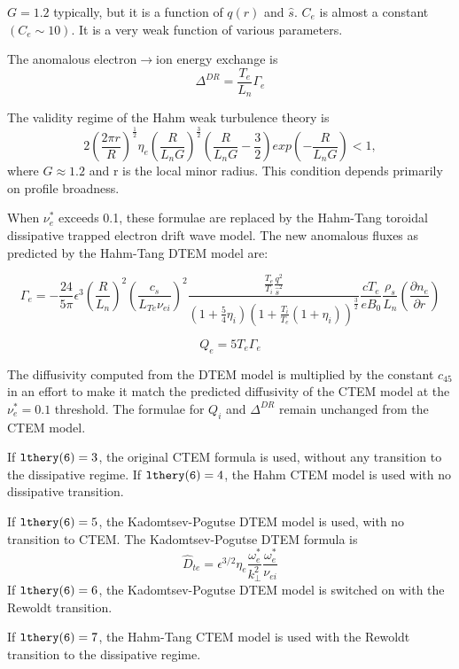 $G = 1.2$ typically, but it is a function of $q(r)$ and $\hat{s}.$
$C_{e}$ is almost a constant $(C_{e} \sim 10).$
It is a very weak function of various parameters.

The anomalous electron$\rightarrow$ion energy exchange is
\[
\Delta^{DR} = \frac{T_{e}}{L_{n}}\Gamma_{e}
\]
 

The validity regime of the Hahm weak turbulence theory is
\[
2
\left(\frac{2\pi
r}{R}\right)^\frac{1}{2}\eta_{e}\left(\frac{R}{L_{n}G}\right)^\frac{3}{2}\left(\frac{R}{L_{n}G}
- \frac{3}{2}\right)exp\left(-\frac{R}{L_{n}G}\right) < 1 ,\] 
where $G\approx 1.2$ and r is the local minor radius. This condition
depends primarily on profile broadness.

When $\nu_{e}^{*}$ exceeds 0.1, these formulae are replaced by the
Hahm-Tang toroidal dissipative trapped electron drift wave model.
The new anomalous fluxes as predicted by the Hahm-Tang DTEM model are:

\[
\Gamma_{e}=-\frac{24}{5\pi}\epsilon^{3}\left(\frac{R}{L_{n}}\right)^{2}
           \left(\frac{c_{s}}{L_{Te}\nu_{ei}}\right)^{2}
           \frac{\frac{T_{e}}{T_{i}}\frac{q^{2}}{\hat s^{2}}}
           {(1+\frac{5}{4}\eta_{i})(1+\frac{T_{i}}{T_{e}}
           (1+\eta_{i}))^{\frac{3}{2}}}\frac{cT_{e}}{eB_{0}}
           \frac{\rho_{s}}{L_{n}}\left(\frac{\partial{n_{e}}}
           {\partial{r}}\right)
\]

\[
Q_{e}=5T_{e}\Gamma_{e}
\]

The diffusivity computed from the DTEM model is multiplied by the 
constant $c_{45}$ in an effort to make it match the predicted diffusivity
of the CTEM model at the $ \nu_{e}^{*}=0.1 $ threshold.  The formulae
for $Q_{i}$ and $\Delta^{DR}$ remain unchanged from the CTEM model.
 
If $ {\tt lthery(6)} = 3 $, the original CTEM formula is used, without any
transition to the dissipative regime.  If $ {\tt lthery(6)} = 4 $,
the Hahm CTEM model is used with no dissipative transition. 

If $ {\tt lthery(6)} = 5 $, the Kadomtsev-Pogutse DTEM model is used,
with no transition to CTEM.  The Kadomtsev-Pogutse DTEM formula is 
\[
{\hat D}_{te}=\epsilon^{3/2}\eta_{e}\frac{\omega_{e}^{*}}{k_{\perp}^{2}}
\frac{\omega_{e}^{*}}{\nu_{ei}}
\]
If $ {\tt lthery(6)} = 6 $, the Kadomtsev-Pogutse DTEM model is 
switched on with the Rewoldt transition.

If $ {\tt lthery(6)} = 7 $, the Hahm-Tang CTEM model is used with the
Rewoldt transition to the dissipative regime.

